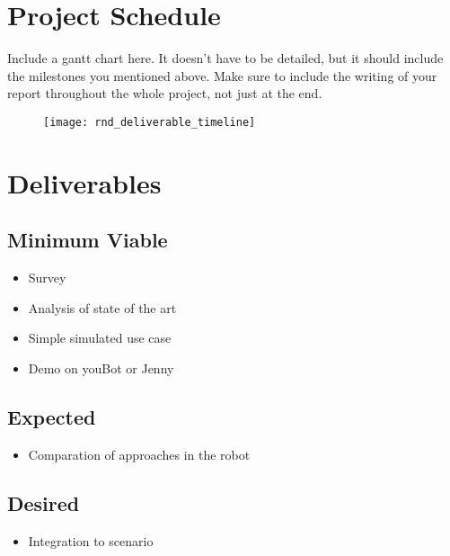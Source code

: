 \documentclass[thesis]{mas_proposal}
\begin{document}
\section{Project Schedule}
Include a gantt chart here. It doesn't have to be detailed, but it should include the milestones you mentioned above.
Make sure to include the writing of your report throughout the whole project, not just at the end.

\begin{figure}[h!]
    \texttt{[image: rnd\_deliverable\_timeline]}
    \caption{}
    \label{}
\end{figure}

\section{Deliverables}
\subsection{Minimum Viable}

\begin{itemize}
    \item Survey
    \item Analysis of state of the art
    \item Simple simulated use case
    \item Demo on youBot or Jenny
\end{itemize}

\subsection{Expected}
\begin{itemize}
    \item Comparation of approaches in the robot
\end{itemize}

\subsection{Desired}
\begin{itemize}
    \item Integration to scenario
\end{itemize}


\nocite{*}

\end{document}
